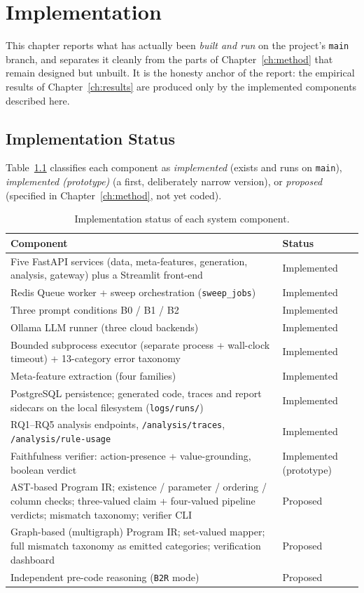 \chapter{Implementation}
\label{ch:impl}

This chapter reports what has actually been \emph{built and run} on
the project's \texttt{main} branch, and separates it cleanly from the
parts of Chapter~\ref{ch:method} that remain designed but unbuilt. It
is the honesty anchor of the report: the empirical results of
Chapter~\ref{ch:results} are produced only by the implemented
components described here.

\section{Implementation Status}

Table~\ref{tab:impl-status} classifies each component as
\emph{implemented} (exists and runs on \texttt{main}),
\emph{implemented (prototype)} (a first, deliberately narrow version),
or \emph{proposed} (specified in Chapter~\ref{ch:method}, not yet
coded).

\begin{table}[H]
\centering
\caption{Implementation status of each system component.}
\label{tab:impl-status}
\small
\renewcommand{\arraystretch}{1.25}
\begin{tabular}{p{8.2cm} p{4.6cm}}
\toprule
\textbf{Component} & \textbf{Status} \\
\midrule
Five FastAPI services (data, meta-features, generation, analysis,
gateway) plus a Streamlit front-end & Implemented \\
Redis Queue worker + sweep orchestration (\texttt{sweep\_jobs}) &
Implemented \\
Three prompt conditions B0 / B1 / B2 & Implemented \\
Ollama LLM runner (three cloud backends) & Implemented \\
Bounded subprocess executor (separate process + wall-clock timeout) +
13-category error taxonomy & Implemented \\
Meta-feature extraction (four families) & Implemented \\
PostgreSQL persistence; generated code, traces and report sidecars on
the local filesystem (\texttt{logs/runs/}) & Implemented \\
RQ1--RQ5 analysis endpoints, \texttt{/analysis/traces},
\texttt{/analysis/rule-usage} & Implemented \\
Faithfulness verifier: action-presence + value-grounding, boolean
verdict & Implemented (prototype) \\
AST-based Program IR; existence / parameter / ordering / column
checks; three-valued claim + four-valued pipeline verdicts;
mismatch taxonomy; verifier CLI & Proposed \\
Graph-based (multigraph) Program IR; set-valued mapper; full
mismatch taxonomy as emitted categories; verification dashboard &
Proposed \\
Independent pre-code reasoning (\texttt{B2R} mode) & Proposed \\
\bottomrule
\end{tabular}
\end{table}


